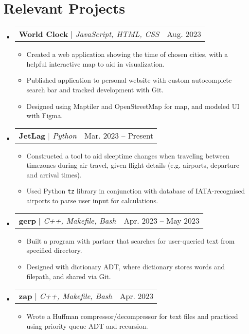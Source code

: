 \documentclass[letterpaper,11pt]{article}
\makeatletter
\newcommand{\resumeItem}[1]{
  \item\small{
    {#1 \vspace{-2pt}}
  }
}
\newcommand{\resumeProjectHeading}[2]{
    \item
    \begin{tabular*}{0.97\textwidth}{l@{\extracolsep{\fill}}r}
      \small#1 & #2 \\
    \end{tabular*}\vspace{-7pt}
}
\newcommand{\resumeSubHeadingListStart}{\begin{itemize}[leftmargin=0.15in, label={}]}
\newcommand{\resumeSubHeadingListEnd}{\end{itemize}}
\newcommand{\resumeItemListStart}{\begin{itemize}}
\newcommand{\resumeItemListEnd}{\end{itemize}\vspace{-5pt}}
\makeatother
\begin{document}
\section{Relevant Projects}
    \resumeSubHeadingListStart
      \resumeProjectHeading
          {\textbf{World Clock} $|$ \emph{JavaScript, HTML, CSS}}{Aug. 2023}
          \resumeItemListStart
            \resumeItem{Created a web application showing the time of chosen cities, with a helpful interactive map to aid in visualization.}
            \resumeItem{Published application to personal website with custom autocomplete search bar and tracked development with Git.}
            \resumeItem{Designed using Maptiler and OpenStreetMap for map, and modeled UI with Figma.}
          \resumeItemListEnd
      \resumeProjectHeading
          {\textbf{JetLag} $|$ \emph{Python}}{Mar. 2023 – Present}
          \resumeItemListStart
            \resumeItem{Constructed a tool to aid sleeptime changes when traveling between timezones during air travel,
            given flight details (e.g. airports, departure and arrival
            times).}
            \resumeItem{Used Python \texttt{tz} library in conjunction with database of
            IATA-recognised airports to parse user input for calculations.}
          \resumeItemListEnd
  


      \resumeProjectHeading
          {\textbf{gerp} $|$ \emph{C++, Makefile, Bash}}{Apr. 2023 – May 2023}
          \resumeItemListStart
            \resumeItem{Built a program with partner that searches for user-queried text from specified directory.}
            \resumeItem{Designed with dictionary ADT, where dictionary stores words and filepath, and shared via Git.}
          \resumeItemListEnd
          \resumeProjectHeading
          {\textbf{zap} $|$ \emph{C++, Makefile, Bash}}{Apr. 2023}
          \resumeItemListStart
          \resumeItem{Wrote a Huffman compressor/decompressor for text files and practiced using priority queue ADT and recursion.}
          \resumeItemListEnd
    \resumeSubHeadingListEnd
\end{document}
